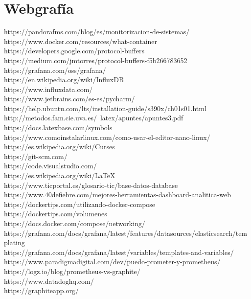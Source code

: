 \documentclass[ spanish, a4paper, 12pt, oneside]{report}
\begin{document}
\section{Webgrafía}
https://pandorafms.com/blog/es/monitorizacion-de-sistemas/ \\
https://www.docker.com/resources/what-container \\
https://developers.google.com/protocol-buffers \\
https://medium.com/jmtorres/protocol-buffers-f5b266783652 \\
https://grafana.com/oss/grafana/ \\
https://en.wikipedia.org/wiki/InfluxDB \\
https://www.influxdata.com/ \\
https://www.jetbrains.com/es-es/pycharm/ \\
https://help.ubuntu.com/lts/installation-guide/s390x/ch01s01.html \\
http://metodos.fam.cie.uva.es/~latex/apuntes/apuntes3.pdf \\
https://docs.latexbase.com/symbols \\
https://www.comoinstalarlinux.com/como-usar-el-editor-nano-linux/\\
https://es.wikipedia.org/wiki/Curses \\
https://git-scm.com/ \\
https://code.visualstudio.com/ \\
https://es.wikipedia.org/wiki/LaTeX \\
https://www.ticportal.es/glosario-tic/base-datos-database \\
https://www.40defiebre.com/mejores-herramientas-dashboard-analitica-web \\
https://dockertips.com/utilizando-docker-compose \\
https://dockertips.com/volumenes \\
https://docs.docker.com/compose/networking/ \\
https://grafana.com/docs/grafana/latest/features/datasources/elasticsearch/templating \\
https://grafana.com/docs/grafana/latest/variables/templates-and-variables/ \\
https://www.paradigmadigital.com/dev/puedo-prometer-y-prometheus/ \\
https://logz.io/blog/prometheus-vs-graphite/ \\
https://www.datadoghq.com/ \\
https://graphiteapp.org/ \\
\end{document}
